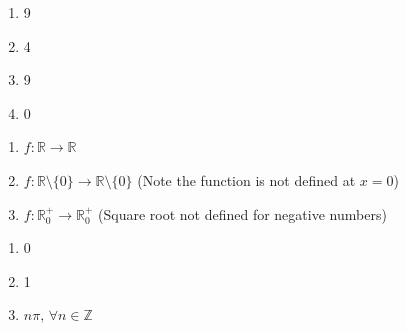   \begin{Solution}
    \begin{enumerate}
      \item{
          \begin{enumerate}
            \item{9}
            \item{4}
            \item{9}
            \item{0}
          \end{enumerate}
        }
      \item{
          \begin{enumerate}
            \item{\(f: \mathbb{R} \to \mathbb{R}\)}
            \item{\(f: \mathbb{R} \setminus \{0\} \to \mathbb{R} \setminus \{0\}\) (Note the function is not defined at \(x=0\))}
            \item{\(f: \mathbb{R}^{+}_{0} \to \mathbb{R}^{+}_{0}\) (Square root not defined for negative numbers)}
          \end{enumerate}
      \item{
          \begin{enumerate}
            \item{0}
            \item{1}
            \item{\(n\pi, \, \forall n \in \mathbb{Z}\)}
          \end{enumerate}
        }
        }
    \end{enumerate}
  \end{Solution}
